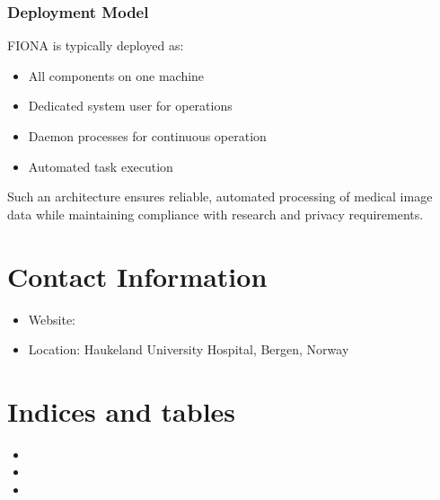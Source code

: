\documentclass[letterpaper,10pt,english]{sphinxmanual}
\begin{document}
\subsection{Deployment Model}
\label{\detokenize{Temp/architecture-options:deployment-model}}
\sphinxAtStartPar
FIONA is typically deployed as:
\begin{itemize}
\item {} 
\sphinxAtStartPar
{} \sphinxhyphen{} All components on one machine

\item {} 
\sphinxAtStartPar
{} \sphinxhyphen{} Dedicated system user for operations

\item {} 
\sphinxAtStartPar
{} \sphinxhyphen{} Daemon processes for continuous operation

\item {} 
\sphinxAtStartPar
{} \sphinxhyphen{} Automated task execution

\end{itemize}

\sphinxAtStartPar
Such an architecture ensures reliable, automated processing of medical image data while maintaining compliance with research and privacy requirements.


\chapter{Contact Information}
\label{\detokenize{index:contact-information}}\begin{itemize}
\item {} 
\sphinxAtStartPar
Website: 

\item {} 
\sphinxAtStartPar
Location: Haukeland University Hospital, Bergen, Norway

\end{itemize}


\chapter{Indices and tables}
\label{\detokenize{index:indices-and-tables}}\begin{itemize}
\item {} 
\sphinxAtStartPar
{}

\item {} 
\sphinxAtStartPar
{}

\item {} 
\sphinxAtStartPar
{}

\end{itemize}



\renewcommand{\indexname}{Index}
\printindex
\end{document}
